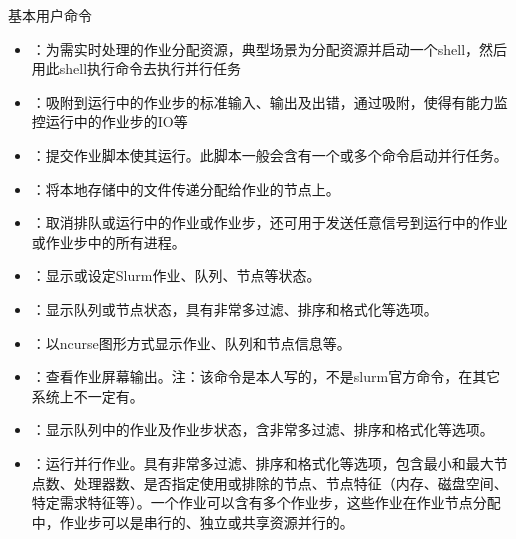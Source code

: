 \begin{frame}{基本用户命令}
\begin{itemize}
	\item {}：为需实时处理的作业分配资源，典型场景为分配资源并启动一个shell，然后用此shell执行命令去执行并行任务
	\item {}：吸附到运行中的作业步的标准输入、输出及出错，通过吸附，使得有能力监控运行中的作业步的IO等
	\item {}：提交作业脚本使其运行。此脚本一般会含有一个或多个命令启动并行任务。
	\item {}：将本地存储中的文件传递分配给作业的节点上。%
	\item {}：取消排队或运行中的作业或作业步，还可用于发送任意信号到运行中的作业或作业步中的所有进程。
	\item {}：显示或设定Slurm作业、队列、节点等状态。
	\item {}：显示队列或节点状态，具有非常多过滤、排序和格式化等选项。
	\item {}：以ncurse图形方式显示作业、队列和节点信息等。
	\item {}：查看作业屏幕输出。注：该命令是本人写的，不是slurm官方命令，在其它系统上不一定有。
	\item {}：显示队列中的作业及作业步状态，含非常多过滤、排序和格式化等选项。
	\item {}：运行并行作业。具有非常多过滤、排序和格式化等选项，包含最小和最大节点数、处理器数、是否指定使用或排除的节点、节点特征（内存、磁盘空间、特定需求特征等）。一个作业可以含有多个作业步，这些作业在作业节点分配中，作业步可以是串行的、独立或共享资源并行的。
\end{itemize}
\end{frame}

